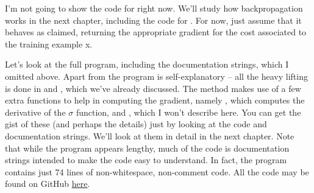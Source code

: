 \documentclass[a4paper,twoside,10pt]{book}
\begin{document}
I'm not going to show the code for  right now. We'll study how backpropagation works in the next chapter, including the code for . For now, just assume that it behaves as claimed, returning the appropriate gradient for the cost associated to the training example x.

Let's look at the full program, including the documentation strings, which I omitted above. Apart from  the program is self-explanatory -- all the heavy lifting is done in  and , which we've already discussed. The  method makes use of a few extra functions to help in computing the gradient, namely , which computes the derivative of the $\sigma$ function, and  , which I won't describe here. You can get the gist of these (and perhaps the details) just by looking at the code and documentation strings. We'll look at them in detail in the next chapter. Note that while the program appears lengthy, much of the code is documentation strings intended to make the code easy to understand. In fact, the program contains just 74 lines of non-whitespace, non-comment code. All the code may be found on GitHub \href{https://github.com/mnielsen/neural-networks-and-deep-learning/blob/master/src/network.py}{here}.
\end{document}

